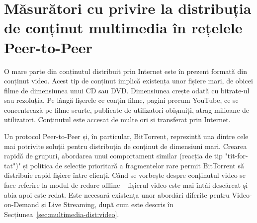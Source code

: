 
\chapter{Măsurători cu privire la distribuția de conținut multimedia în
	rețelele Peer-to-Peer}
\label{chapter:multimedia-dist}

O mare parte din conținutul distribuit prin Internet este în prezent formată
din conținut video. Acest tip de conținut implică existența unor fișiere mari,
de obicei filme de dimensiunea unui CD sau DVD. Dimensiunea crește odată
cu bitrate-ul sau rezoluția. Pe lângă fișerele ce conțin filme, pagini
precum YouTube, ce se concentrează pe filme scurte, publicate de
utilizatori obișnuiți, atrag milioane de utilizatori. Conținutul este
accesat de multe ori și transferat prin Internet.

Un protocol Peer-to-Peer și, în particular, BitTorrent, reprezintă una dintre
cele mai potrivite soluții pentru distribuția de conținut de dimensiuni mari.
Crearea rapidă de grupuri, abordarea unui comportament similar (reacția de tip
"tit-for-tat")" și politica de selecție prioritară a fragmentelor rare permit
BitTorrent să distribuie rapid fișiere între clienți. Când se vorbește despre
conținutul video se face referire la modul de redare offline -- fișierul video
este mai întâi descărcat și abia apoi este redat. Este necesară existența unor
abordări diferite pentru Video-on-Demand și Live Streaming, după cum este
descris în Secțiunea~\ref{sec:multimedia-dist:video}.

